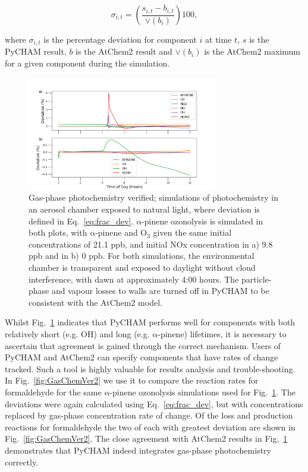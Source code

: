 \documentclass[gmd, manuscript]{copernicus}
\begin{document}
\begin{equation} \label{eq:frac_dev}
\sigma_{i,t} = \left(\frac{s_{i,t}-b_{i,t}}{\lor(b_{i})}\right)100\mathrm{,}
\end{equation}

where $\sigma_{i,t}$ is the percentage deviation for component $i$ at time $t$, $s$ is the PyCHAM result, $b$ is the AtChem2 result and $\lor(b_{i})$ is the AtChem2 maximum for a given component during the simulation.

\begin{figure}[t]
\includegraphics[width=8.3cm]{Results/photo_chem_conc_dev.png}
\caption{Gas-phase photochemistry verified; simulations of photochemistry in an aerosol chamber exposed to natural light, where deviation is defined in Eq.~\ref{eq:frac_dev}.  $\mathrm{\alpha}$-pinene ozonolysis is simulated in both plots, with $\mathrm{\alpha}$-pinene and O$_3$ given the same initial concentrations of 21.1 ppb, and initial NOx concentration in a) 9.8 ppb and in b) 0 ppb.  For both simulations, the environmental chamber is transparent and exposed to daylight without cloud interference, with dawn at approximately 4:00 hours.  The particle-phase and vapour losses to walls are turned off in PyCHAM to be consistent with the AtChem2 model.}
\label{fig:GasChemVer1}
\end{figure}

Whilst Fig.~\ref{fig:GasChemVer1} indicates that PyCHAM performs well for components with both relatively short (e.g. OH) and long (e.g. $\mathrm{\alpha}$-pinene) lifetimes, it is necessary to ascertain that agreement is gained through the correct mechanism.  Users of PyCHAM and AtChem2 can specify components that have rates of change tracked.  Such a tool is highly valuable for results analysis and trouble-shooting.  In Fig.~\ref{fig:GasChemVer2} we use it to compare the reaction rates for formaldehyde for the same $\mathrm{\alpha}$-pinene ozonolysis simulations used for Fig.~\ref{fig:GasChemVer1}.  The deviations were again calculated using Eq.~\ref{eq:frac_dev}, but with concentrations replaced by gas-phase concentration rate of change.  Of the loss and production reactions for formaldehyde the two of each with greatest deviation are shown in Fig.~\ref{fig:GasChemVer2}.  The close agreement with AtChem2 results in Fig.~\ref{fig:GasChemVer1} demonstrates that PyCHAM indeed integrates gas-phase photochemistry correctly.
\end{document}
